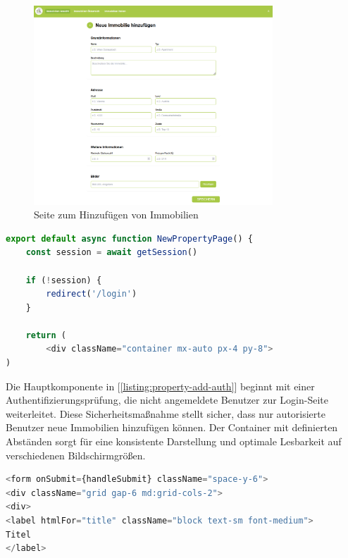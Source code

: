 		\begin{figure}
			\centering
			\includegraphics[width=0.80\textwidth]{images/Immobilien_hinzufuegen.png}
			\caption{Seite zum Hinzufügen von Immobilien}
		\end{figure}
		
		
\begin{lstlisting}[language=JavaScript, caption={Authentifizierungsprüfung und Container-Struktur.}, label={listing:property-add-auth}]
export default async function NewPropertyPage() {
	const session = await getSession()
					
	if (!session) {
		redirect('/login')
	}
					
	return (
	    <div className="container mx-auto px-4 py-8">
)
\end{lstlisting}

			
			Die Hauptkomponente in [\ref{listing:property-add-auth}] beginnt mit einer Authentifizierungsprüfung, die nicht angemeldete Benutzer zur Login-Seite weiterleitet. Diese Sicherheitsmaßnahme stellt sicher, dass nur autorisierte Benutzer neue Immobilien hinzufügen können. Der Container mit definierten Abständen sorgt für eine konsistente Darstellung und optimale Lesbarkeit auf verschiedenen Bildschirmgrößen.

\newpage

\begin{lstlisting}[language=JavaScript, caption={Beginn des Formularinhalts.}, label={listing:property-form-content-start}]
<form onSubmit={handleSubmit} className="space-y-6">
<div className="grid gap-6 md:grid-cols-2">
<div>
<label htmlFor="title" className="block text-sm font-medium">
Titel
</label>
\end{lstlisting}

